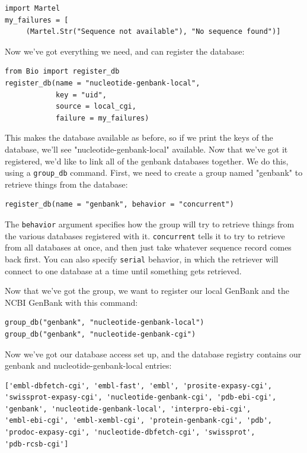 \documentclass{report}
\begin{document}
\begin{verbatim}
import Martel
my_failures = [
     (Martel.Str("Sequence not available"), "No sequence found")]
\end{verbatim}

Now we've got everything we need, and can register the database:

\begin{verbatim}
from Bio import register_db
register_db(name = "nucleotide-genbank-local",
            key = "uid",
            source = local_cgi,
            failure = my_failures)
\end{verbatim}

This makes the database available as before, so if we print the keys of
the database, we'll see "nucleotide-genbank-local" available. Now that
we've got it registered, we'd like to link all of the genbank databases
together. We do this, using a \verb|group_db| command. First, we need to
create a group named "genbank" to retrieve things from the database:

\begin{verbatim}
register_db(name = "genbank", behavior = "concurrent")
\end{verbatim}

The \verb|behavior| argument specifies how the group will try to
retrieve things from the various databases registered with it.
\verb|concurrent| tells it to try to retrieve from all databases at
once, and then just take whatever sequence record comes back first. You
can also specify \verb|serial| behavior, in which the retriever will
connect to one database at a time until something gets retrieved.

Now that we've got the group, we want to register our local GenBank and
the NCBI GenBank with this command:

\begin{verbatim}
group_db("genbank", "nucleotide-genbank-local")
group_db("genbank", "nucleotide-genbank-cgi")
\end{verbatim}

Now we've got our database access set up, and the database registry
contains our genbank and nucleotide-genbank-local entries:

\begin{verbatim}
['embl-dbfetch-cgi', 'embl-fast', 'embl', 'prosite-expasy-cgi',
'swissprot-expasy-cgi', 'nucleotide-genbank-cgi', 'pdb-ebi-cgi',
'genbank', 'nucleotide-genbank-local', 'interpro-ebi-cgi',
'embl-ebi-cgi', 'embl-xembl-cgi', 'protein-genbank-cgi', 'pdb',
'prodoc-expasy-cgi', 'nucleotide-dbfetch-cgi', 'swissprot',
'pdb-rcsb-cgi']
\end{verbatim}
\end{document}
